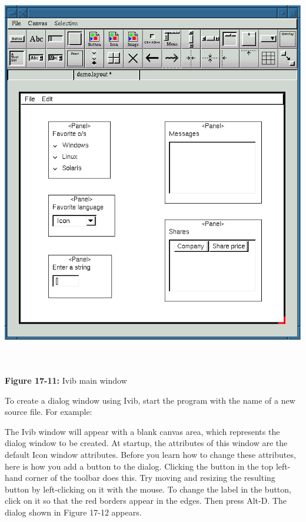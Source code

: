 \begin{center}
\includegraphics[width=5.9957in,height=6.7866in]{ub-img/ub-img60.png}
\end{center}

{\sffamily\bfseries Figure 17-11:}
{\sffamily Ivib main window}

To create a dialog window using Ivib, start the program with the name of
a new source file. For example:


The Ivib window will appear with a blank
{\textquotedbl}canvas{\textquotedbl} area, which represents the dialog
window to be created. At startup, the attributes of this window are the
default Icon window attributes. Before you learn how to change these
attributes, here is how you add a button to the dialog. Clicking the
button in the top left-hand corner of the toolbar does this. Try moving
and resizing the resulting button by left-clicking on it with the
mouse. To change the label in the button, click on it so that the red
borders appear in the edges. Then press Alt-D. The dialog shown in
Figure 17-12 appears.

